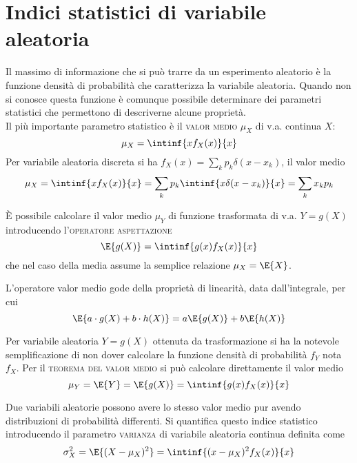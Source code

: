 \section{Indici statistici di variabile aleatoria}
Il massimo di informazione che si può trarre da un esperimento aleatorio è la funzione densità di probabilità che caratterizza la variabile aleatoria.
Quando non si conosce questa funzione è comunque possibile determinare dei parametri statistici che permettono di descriverne alcune proprietà.\\

Il più importante parametro statistico è il \textsc{valor medio} $\mu_X$ di v.a. continua $X$:
\begin{equation}
\label{eq:v_a_media}
	\mu_X=\intinf{x f_X(x)}{x}
\end{equation}
Per variabile aleatoria discreta si ha $f_X(x)=\sum_k p_k\delta(x-x_k)$, il valor medio
\begin{equation}
\label{eq:v_a_discreta_media}
	\mu_X=\intinf{x f_X(x)}{x}=\sum_k p_k \intinf{x \delta(x-x_k)}{x}=\sum_k x_k p_k
\end{equation}

\`E possibile calcolare il valor medio $\mu_Y$ di funzione trasformata di v.a. $Y=g(X)$ introducendo l'\textsc{operatore aspettazione}
\begin{equation}
	\E{g(X)}=\intinf{g(x)f_X(x)}{x}
\end{equation}
che nel caso della media assume la semplice relazione $\mu_X=\E{X}$.

L'operatore valor medio gode della proprietà di linearità, data dall'integrale, per cui
\begin{equation}
	\E{a\cdot g(X)+b\cdot h(X)}=a \E{g(X)}+b \E{h(X)}
\end{equation}

Per variabile aleatoria $Y=g(X)$ ottenuta da trasformazione si ha la notevole semplificazione di non dover calcolare la funzione densità di probabilità $f_Y$ nota $f_X$.
Per il \textsc{teorema del valor medio} si può calcolare direttamente il valor medio
\begin{equation}
\label{eq:teo_valor_medio}
	\mu_Y=\E{Y}=\E{g(X)}=\intinf{g(x) f_X(x)}{x}
\end{equation}

Due variabili aleatorie possono avere lo stesso valor medio pur avendo distribuzioni di probabilità differenti. Si quantifica questo indice statistico introducendo il parametro \textsc{varianza} di variabile aleatoria continua definita come
\begin{equation}
\label{eq:v_a_varianza}
	\sigma^2_X=\E{(X-\mu_X)^2}=\intinf{(x-\mu_X)^2 f_X(x)}{x}
\end{equation}

